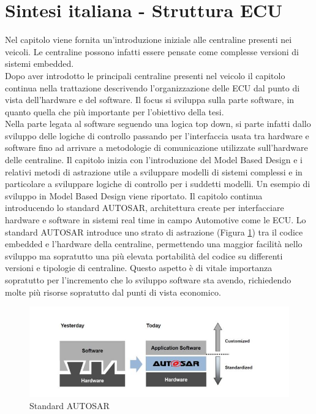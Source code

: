 \documentclass[../main.tex]{subfiles}
\begin{document}
\section{Sintesi italiana - Struttura ECU}
Nel capitolo viene fornita un'introduzione iniziale alle centraline presenti nei veicoli. Le centraline possono infatti essere pensate come complesse versioni di sistemi embedded.\\
Dopo aver introdotto le principali centraline presenti nel veicolo il capitolo continua nella trattazione descrivendo l'organizzazione delle \gls{ECU} dal punto di vista dell'hardware e del software. Il focus si sviluppa sulla parte software, in quanto quella che più importante per l'obiettivo della tesi.\\
Nella parte legata al software seguendo una logica top down, si parte infatti dallo sviluppo delle logiche di controllo passando per l'interfaccia usata tra hardware e software fino ad arrivare a metodologie di comunicazione utilizzate sull'hardware delle centraline. Il capitolo inizia con l'introduzione del Model Based Design  e i relativi metodi di astrazione utile a sviluppare modelli di sistemi complessi e in particolare a sviluppare logiche di controllo per i suddetti modelli. Un esempio di sviluppo in Model Based Design viene riportato. Il capitolo continua introducendo lo standard \gls{AUTOSAR}, architettura create per interfacciare hardware e software in sistemi real time in campo Automotive come le \gls{ECU}. Lo standard \gls{AUTOSAR} introduce uno strato di astrazione (Figura \ref{fig:autosar}) tra il codice embedded e l'hardware della centraline, permettendo una maggior facilità nello sviluppo ma sopratutto una più elevata portabilità del codice su differenti versioni e tipologie di centraline. Questo aspetto è di vitale importanza sopratutto per l'incremento che lo sviluppo software sta avendo, richiedendo molte più risorse sopratutto dal punti di vista economico.
\begin{figure}[h]
    \centering
    \includegraphics[width=\linewidth]{images_folder/autosarcapture.jpg}
    \caption{Standard AUTOSAR}
    \label{fig:autosar}
\end{figure}
\end{document}

